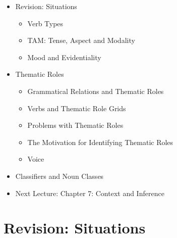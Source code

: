 \documentclass[headrule,footrule]{foils}
\begin{document}
\maketitle

%


\begin{itemize}\addtolength{\itemsep}{-1ex}
\item Revision: Situations
  \begin{itemize}
  \item Verb Types
  \item TAM: Tense, Aspect and Modality
  \item Mood and Evidentiality
  \end{itemize}
\item Thematic Roles
  \begin{itemize}
  \item Grammatical Relations and Thematic Roles
  \item Verbs and Thematic Role Grids
  \item Problems with Thematic Roles
  \item The Motivation for Identifying Thematic Roles
 \item Voice
 \end{itemize}
\item Classifiers and Noun Classes

\item Next Lecture: Chapter 7: Context and Inference
\end{itemize}




\section{Revision: Situations}
\end{document}

